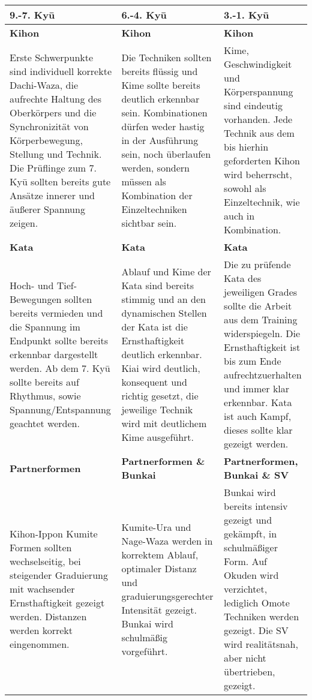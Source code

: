 	\null\vfill\null
	\begin{tabularx}{\linewidth}{XXX}
		9.-7. Ky\={u}	& 6.-4. Ky\={u}	& 3.-1. Ky\={u}\\
		\midrule
		{\footnotesize \textbf{Kihon}}&{\footnotesize \textbf{Kihon}}&{\footnotesize \textbf{Kihon}}\\
		{\footnotesize Erste Schwerpunkte sind individuell korrekte Dachi-Waza, die aufrechte Haltung des Oberkörpers und die Synchronizität von Körperbewegung, Stellung und Technik. Die Prüflinge zum 7. Ky\={u} sollten bereits gute Ansätze innerer und äußerer Spannung zeigen.}&{\footnotesize Die Techniken sollten bereits flüssig und Kime sollte bereits deutlich erkennbar sein. Kombinationen dürfen weder hastig in der Ausführung sein, noch überlaufen werden, sondern müssen als Kombination der Einzeltechniken sichtbar sein.}&{\footnotesize Kime, Geschwindigkeit und Körperspannung sind eindeutig vorhanden. Jede Technik aus dem bis hierhin geforderten Kihon wird beherrscht, sowohl als Einzeltechnik, wie auch in Kombination.}\\
		{\footnotesize \textbf{Kata}}&{\footnotesize \textbf{Kata}}&{\footnotesize \textbf{Kata}}\\
		{\footnotesize Hoch- und Tief-Bewegungen sollten bereits vermieden und die Spannung im Endpunkt sollte bereits erkennbar dargestellt werden. Ab dem 7. Ky\={u} sollte bereits auf Rhythmus, sowie Spannung/Entspannung geachtet werden.}&{\footnotesize Ablauf und Kime der Kata sind bereits stimmig und an den dynamischen Stellen der Kata ist die Ernsthaftigkeit deutlich erkennbar. Kiai wird deutlich, konsequent und richtig gesetzt, die jeweilige Technik wird mit deutlichem Kime ausgeführt.}&{\footnotesize Die zu prüfende Kata des jeweiligen Grades sollte die Arbeit aus dem Training widerspiegeln. Die Ernsthaftigkeit ist bis zum Ende aufrechtzuerhalten und immer klar erkennbar. Kata ist auch Kampf, dieses sollte klar gezeigt werden.}\\
		{\footnotesize \textbf{Partnerformen}}&{\footnotesize \textbf{Partnerformen \& Bunkai}}&{\footnotesize \textbf{Partnerformen, Bunkai \& SV}}\\
		{\footnotesize Kihon-Ippon Kumite Formen sollten wechselseitig, bei steigender Graduierung mit wachsender Ernsthaftigkeit gezeigt werden. Distanzen werden korrekt eingenommen.}&{\footnotesize Kumite-Ura und Nage-Waza werden in korrektem Ablauf, optimaler Distanz und graduierungsgerechter Intensität gezeigt. Bunkai wird schulmäßig vorgeführt.}&{\footnotesize Bunkai wird bereits intensiv gezeigt und gekämpft, in schulmäßiger Form. Auf Okuden wird verzichtet, lediglich Omote Techniken werden gezeigt. Die SV wird realitätsnah, aber nicht übertrieben, gezeigt.}\\
	\end{tabularx}\null\vfill\null
	\setlength{\tabcolsep}{6pt}